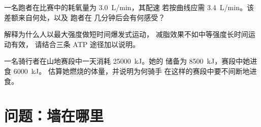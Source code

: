 \begin{exercise}[$\star\star\star$]\label{exo:g10:exercise-and-energy:13}
一名跑者在比赛中的耗氧量为 \qty{3.0}{L/min}，其配速
若按曲线应需 \qty{3.4}{L/min}。该差额来自何处，以及
跑者在
几分钟后会有何感受？
\end{exercise}

\begin{exercise}[$\star\star\star$]\label{exo:g10:exercise-and-energy:14}
解释为什么人以最大强度做短时间爆发式运动，
减脂效果不如中等强度长时间运动有效，
请结合三条 ATP 途径加以说明。
\end{exercise}

\begin{exercise}[$\star\star\star$]\label{exo:g10:exercise-and-energy:15}
一名骑行者在山地赛段中一天消耗 \qty{25000}{kJ}。她的
储备为 \qty{8500}{kJ}，赛段中她进食 \qty{6000}{kJ}。
估算她燃烧的体量，并说明为何骑手
在这样的赛段中要不间断地进食。
\end{exercise}

\section{问题：墙在哪里}


